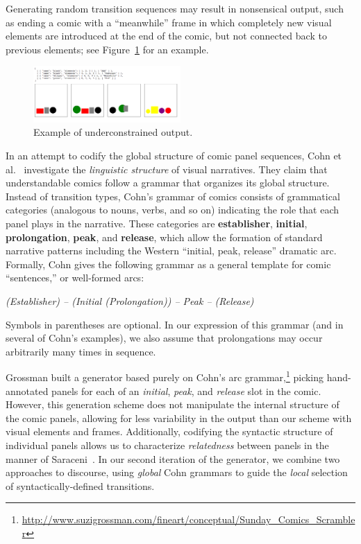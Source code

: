 Generating random transition sequences may result in nonsensical output,
such as ending a comic with a ``meanwhile'' frame in which completely new
visual elements are introduced at the end of the comic, but not connected
back to previous elements; see Figure~\ref{fig:outbad} for an example. 

\begin{figure}
\includegraphics[width=0.5\textwidth]{comicgen-underconstrained-2.png}
\caption{Example of underconstrained output.}
\label{fig:outbad}
\end{figure}

In an attempt to codify the global structure of comic panel sequences,
Cohn et al.~\cite{cohn2013visual} investigate the {\em linguistic
structure} of visual narratives. They claim that understandable comics
follow a grammar that organizes its global structure. Instead of transition
types, Cohn's grammar of comics consists of grammatical categories
(analogous to nouns, verbs, and so on) indicating the role that each panel
plays in the narrative. These categories are {\bf establisher}, {\bf
initial}, {\bf prolongation}, {\bf peak}, and {\bf release}, which allow
the formation of standard narrative patterns including the Western
``initial, peak, release'' dramatic arc. Formally, Cohn gives the following
grammar as a general template for comic ``sentences,'' or well-formed arcs:

{\it
(Establisher) -- (Initial (Prolongation)) -- Peak -- (Release)}

Symbols in parentheses are optional. In our expression of this grammar (and
in several of Cohn's examples), we also assume that prolongations may occur
arbitrarily many times in sequence.

Grossman built a generator based purely on Cohn's arc grammar,\footnote{
\url{http://www.suzigrossman.com/fineart/conceptual/Sunday_Comics_Scrambler}
} picking hand-annotated panels for each of an {\em initial}, {\em peak},
and {\em release} slot in the comic. However, this generation scheme does
not manipulate the internal structure of the comic panels, allowing for
less variability in the output than our scheme with visual elements and
frames. Additionally, codifying the syntactic structure of individual
panels allows us to characterize {\em relatedness} between panels in the
manner of Saraceni~\cite{saraceni2016relatedness}. In our second iteration
of the generator, we combine two approaches to discourse, using {\em
global} Cohn grammars to guide the {\em local} selection of
syntactically-defined transitions.

